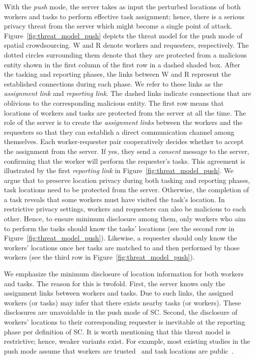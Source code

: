 \documentclass{USC-Thesis}
\numberwithin{equation}{chapter}
\begin{document}
With the \emph{push} mode, the server takes as input the perturbed locations of both workers and tasks to perform effective task assignment; hence, there is a serious privacy threat from the server which might become a single point of attack. Figure~\ref{fig:threat_model_push} depicts the threat model for the push mode of spatial crowdsourcing. W and R denote workers and requesters, respectively. The dotted circles surrounding them denote that they are protected from a malicious entity shown in the first column of the first row in a dashed shaded box. After the tasking and reporting phases, the links between W and R represent the established connections during each phase. We refer to these links as the \emph{assignment link} and \emph{reporting link}. The dashed links indicate connections that are oblivious to the corresponding malicious entity.
The first row means that locations of workers and tasks are protected from the server at all the time. The role of the server is to create the \emph{assignment links} between the workers and the requesters so that they can establish a direct communication channel among themselves. Each worker-requester pair cooperatively decides whether to accept the assignment from the server. If yes, they send a \emph{consent} message to the server, confirming that the worker will perform the requester's tasks. This agreement is illustrated by the first \emph{reporting link} in Figure~\ref{fig:threat_model_push}. We argue that to preserve location privacy during both tasking and reporting phases, task locations need to be protected from the server. Otherwise, the completion of a task reveals that some workers must have visited the task's location. In restrictive privacy settings, workers and requesters can also be malicious to each other. Hence, to ensure minimum disclosure among them, only workers who aim to perform the tasks should know the tasks' locations (see the second row in Figure~\ref{fig:threat_model_push}). Likewise, a requester should only know the workers' locations once her tasks are matched to and then performed by those workers (see the third row in Figure~\ref{fig:threat_model_push}). 

We emphasize the minimum disclosure of location information for both workers and tasks. The reason for this is twofold. First, the server knows only the assignment links between workers and tasks. Due to such links, the assigned workers (or tasks) may infer that there exists nearby tasks (or workers). These disclosures are unavoidable in the push mode of SC. Second, the disclosure of workers' locations to their corresponding requester is inevitable at the reporting phase per definition of SC. It is worth mentioning that this threat model is restrictive; hence, weaker variants exist. For example, most existing studies in the push mode assume that workers are trusted~\cite{kazemi2011privacy,pournajaf2014spatial,Hu2015} and task locations are public~\cite{Vu2012,to2014framework,Gong2015,Zhang2015,Shen2016}.
\end{document}
